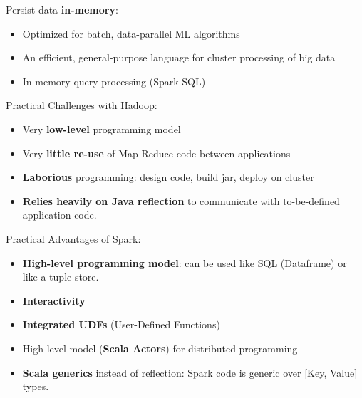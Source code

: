 Persist data {\bf in-memory}:
\begin{itemize}
 \item Optimized for batch, data-parallel ML algorithms
 \item An efficient, general-purpose language for cluster processing of big data
 \item In-memory query processing (Spark SQL)
\end{itemize}

Practical Challenges with Hadoop:
\begin{itemize}
 \item Very {\bf low-level} programming model
 \item Very {\bf little re-use} of Map-Reduce code between applications
 \item {\bf Laborious} programming: design code, build jar, deploy on cluster
 \item {\bf Relies heavily on Java reflection} to communicate with to-be-defined application code.
\end{itemize}

Practical Advantages of Spark:
\begin{itemize}
 \item {\bf High-level programming model}: can be used like SQL (Dataframe) or like a tuple store.
 \item {\bf Interactivity}
 \item {\bf Integrated UDFs} (User-Defined Functions)
 \item High-level model ({\bf Scala Actors}) for distributed programming
 \item {\bf Scala generics} instead of reflection: Spark code is generic over [Key, Value] types.
\end{itemize}







